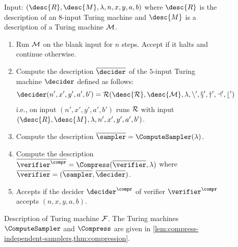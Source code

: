 \begin{figure}[!htp]
  \centering
  \begin{gamespec}
    Input: $(\desc{R}, \desc{M}, \lambda, n, x, y, a, b)$ where $\desc{R}$ is
    the description of an $8$-input Turing machine and $\desc{M}$ is a
    description of a Turing machine $\cal{M}$.

    \begin{enumerate}
    \item Run $\cal{M}$ on the blank input for $n$ steps.
      Accept if it halts and continue otherwise.
    \item Compute the description $\overline{\decider}$ of the $5$-input Turing
      machine $\decider$ defined as follows:
      \[
      	\decider(n',x',y',a',b') = \cal{R}(\desc{R}, \desc{M}, \lambda, n', x', y', a', b')
      \]
      i.e., on input $(n', x', y', a', b')$ runs $\cal{R}$ with
      input $(\desc{R}, \desc{M}, \lambda, n', x', y', a', b')$.
    \item Compute the description $\overline{\sampler} =
      \ComputeSampler(\lambda)$.
    \item Compute the description
      $\overline{\verifier^\compr} = \Compress(\overline{\verifier}, \lambda)$
      where $\overline{\verifier} = (\overline{\sampler}, \overline{\decider})$.
    \item Accepts if the decider $\decider^\compr$ of verifier
      $\verifier^\compr$ accepts $(n, x, y, a, b)$.
    \end{enumerate}
  \end{gamespec}
  \caption{Description of Turing machine $\cal{F}$.
    The Turing machines $\ComputeSampler$ and $\Compress$ are given in
    \cref{lem:compress-independent-samplers,thm:compression}.}
  \label{fig:halt_f}
\end{figure}





